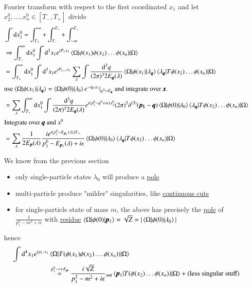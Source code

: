 Fourier transform with respect to the first coordinated $x_1$ and let $x_2^0, \dots, x_n^0 \in [T_-, T_+]$ divide
\begin{align*}
   &\int \dd x_1^0 = \int^\infty_{T_+} + \int^{T_+}_{T_-} + \int_{-\infty}^{T_-} \\
   &\Rightarrow \int_{T_+}^{\infty} \dd x_1^0 \int \dd^3 x_1 e^{iP_1\dot x_1} \braket{\Omega | \phi(x_1) \phi(x_2) \dots \phi(x_n) | \Omega} \\
   &=  \int_{T_+}^{\infty} \dd x_1^0 \int \dd^3 x_1 e^{iP_1 \dots x_1} \sum_{\lambda} \int \frac{\dd^3 q}{(2 \pi)^3 2 E_{\pmb{q}}(\lambda)} \braket{\Omega | \phi(x_1) | \lambda_{\pmb{q}}} \braket{\lambda_{\pmb{q}}|T\phi(x_2)\dots\phi(x_n) | \Omega} \\
   \shortintertext{use $\braket{\Omega | \phi(x_1) | \lambda_{\pmb{q}}} = \braket{\Omega | \phi(0) | \lambda_0}e^{-iq\cdot x_1}|_{q^0 = E_{\pmb{q}}}$ and integrate over $\pmb{x}$. } 
   &= \sum_\lambda \int^{\infty}_{T_+} \dd x_1^0 \int \frac{\dd^3 q}{(2\pi)^3 2 E_{\pmb{q}}(\lambda)} e^{i(p_1^0 - q^0 + i\epsilon)x_1^0} (2\pi)^3 \delta^{(3)}(\pmb{p_1} - \pmb{q}) \braket{\Omega | \phi(0) | \lambda_{0}} \braket{\lambda_{\pmb{q}}|T\phi(x_2)\dots\phi(x_n) | \Omega} \\ 
   \shortintertext{Integrate over $\pmb{q}$ and $x^0$}
   &= \sum_\lambda \frac{1}{2E_{\pmb{p}}(\lambda)} \frac{ie^{i(p_1^0 - E_{\pmb{p}_1}(\lambda))T_+}}{p_1^0 - E_{\pmb{p}_1}(\lambda) + i \epsilon}  \braket{\Omega | \phi(0) | \lambda_{0}} \braket{\lambda_{\pmb{q}}|T\phi(x_2)\dots\phi(x_n) | \Omega}
\end{align*}

We know from the previous section
\begin{itemize}
   \item only single-particle states $\lambda_0$ will produce a \underline{pole}
   \item multi-particle produce "milder" singularities, like \underline{continuous cuts}
   \item for single-particle state of mass $m$, the above has precisely the \underline{pole} of $\frac{1}{p^2_1 - m^2 + i\epsilon}$ with \underline{residue} $\braket{\Omega | \phi(0) | \pmb{p}_1} = \sqrt{Z} = |\braket{\Omega | \phi(0) | \lambda_0}|$
\end{itemize}

hence 
\begin{align}
   \int \dd^4 x_1 e^{ip_1 \cdot x_1} &\braket{\Omega | T(\phi(x_1) \phi(x_2) \dots \phi(x_n)) | \Omega} \\
                                    &\stackrel{p_1^0 \rightarrow +E_{\pmb{p}}}{=} \frac{i\sqrt{Z}}{p^2_1 - m^2 +i\epsilon} {}_\text{out} \braket{\pmb{p}_1 | T(\phi(x_2) \dots \phi(x_n)) | \Omega} + (\text{less singular stuff})
\end{align}

